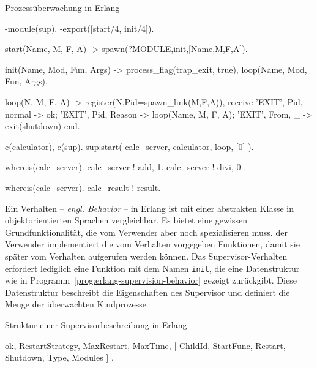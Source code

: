 \begin{program}[!hbt]
\caption{Prozessüberwachung in Erlang}
\label{prog:erlang-supervision}
\noindent\begin{minipage}[t]{.52\textwidth}
\lstset{showlines=true}
\begin{ErlangCode}
-module(sup).
-export([start/4, init/4]).

start(Name, M, F, A) ->
  spawn(?MODULE,init,[Name,M,F,A]).

init(Name, Mod, Fun, Args) ->
  process_flag(trap_exit, true),
  loop(Name, Mod, Fun, Args).

loop(N, M, F, A) ->
  register(N,Pid=spawn_link(M,F,A)),
  receive
    { 'EXIT', Pid, normal } -> ok;
    { 'EXIT', Pid, Reason } -> 
      loop(Name, M, F, A);
    { 'EXIT', From, _ } -> 
			exit(shutdown)
  end.
\end{ErlangCode}

\end{minipage}\hfill
\begin{minipage}[t]{.44\textwidth}
\lstset{showlines=true}
\begin{ErlangCode}
c(calculator), c(sup).
sup:start(
  calc_server, 
  calculator, loop, [0]
).

whereis(calc_server).
calc_server ! {add, 1}.
calc_server ! { divi, 0 }.

whereis(calc_server). 
calc_result ! result.
\end{ErlangCode}

\end{minipage}
\end{program}

Ein Verhalten -- \textit{engl. Behavior} -- in Erlang ist mit einer abstrakten Klasse in objektorientierten Sprachen vergleichbar. Es bietet eine gewissen Grundfunktionalität, die vom Verwender aber noch spezialisieren muss. \Dah der Verwender implementiert die vom Verhalten vorgegeben Funktionen, damit sie später vom Verhalten aufgerufen werden können. Das Supervisor-Verhalten erfordert lediglich eine Funktion mit dem Namen \lstinline{init}, die eine Datenstruktur wie in Programm~\ref{prog:erlang-supervision-behavior} gezeigt zurückgibt. Diese Datenstruktur beschreibt die Eigenschaften des Supervisor und definiert die Menge der überwachten Kindprozesse.

\begin{program}[!hbt]
\caption{Struktur einer Supervisorbeschreibung in Erlang}
\label{prog:erlang-supervision-behavior}
\begin{ErlangCode}
{ ok, 
  { {RestartStrategy, MaxRestart, MaxTime},
	  [ {ChildId, StartFunc, Restart, Shutdown, Type, Modules} ] } }.
\end{ErlangCode}
\end{program}


